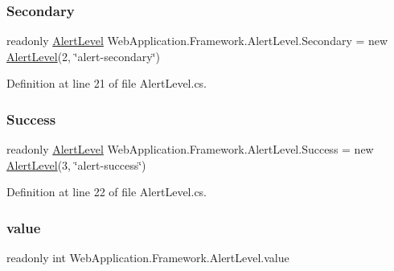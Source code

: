 \subsubsection{\texorpdfstring{Secondary}{Secondary}}
{\footnotesize\ttfamily readonly \mbox{\hyperlink{classWebApplication_1_1Framework_1_1AlertLevel}{Alert\+Level}} Web\+Application.\+Framework.\+Alert\+Level.\+Secondary = new \mbox{\hyperlink{classWebApplication_1_1Framework_1_1AlertLevel}{Alert\+Level}}(2, \char`\"{}alert-\/secondary\char`\"{})\hspace{0.3cm}{\ttfamily [static]}}



Definition at line 21 of file Alert\+Level.\+cs.

\mbox{\label{classWebApplication_1_1Framework_1_1AlertLevel_a387cc8ca0f91197b2c293246e3a845f5}} 
\subsubsection{\texorpdfstring{Success}{Success}}
{\footnotesize\ttfamily readonly \mbox{\hyperlink{classWebApplication_1_1Framework_1_1AlertLevel}{Alert\+Level}} Web\+Application.\+Framework.\+Alert\+Level.\+Success = new \mbox{\hyperlink{classWebApplication_1_1Framework_1_1AlertLevel}{Alert\+Level}}(3, \char`\"{}alert-\/success\char`\"{})\hspace{0.3cm}{\ttfamily [static]}}



Definition at line 22 of file Alert\+Level.\+cs.

\mbox{\label{classWebApplication_1_1Framework_1_1AlertLevel_aa8e313cfae63b3fd070b26b8e4c8f723}} 
\subsubsection{\texorpdfstring{value}{value}}
{\footnotesize\ttfamily readonly int Web\+Application.\+Framework.\+Alert\+Level.\+value\hspace{0.3cm}{\ttfamily [private]}}



